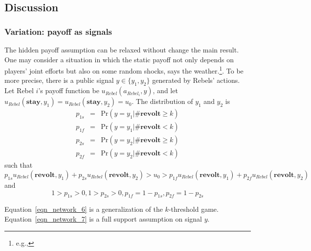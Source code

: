 \documentclass[12pt,letter]{article}
\theoremstyle{definition}
\theoremstyle{remark}
\theoremstyle{claim}
\begin{document}
\subsection{Discussion}
\label{sec:varies}


\subsubsection{Variation: payoff as signals}
The hidden payoff assumption can be relaxed without change the main result. One may consider a situation in which the static payoff not only depends on players' joint efforts but also on some  random shocks, says the weather.\footnote{e.g.,\citep{SHADMEHR2011}}. To be more precise, there is a public signal $y\in \{y_1,y_2\}$ generated by Rebels' actions. Let Rebel $i$'s payoff function be $u_{Rebel}(a_{Rebel_i},y)$, and let $u_{Rebel}(\textbf{stay},y_1)=u_{Rebel}(\textbf{stay},y_2)=u_0$. The distribution of $y_1$ and $y_2$ is 
\begin{eqnarray*}
p_{1s} &=& \mathrm {Pr}(y=y_1|\#\textbf{revolt}\geq k) \\
p_{1f} &=& \mathrm {Pr}(y=y_1|\#\textbf{revolt}< k) \\
p_{2s} &=& \mathrm {Pr}(y=y_2|\#\textbf{revolt}\geq k) \\
p_{2f} &=& \mathrm {Pr}(y=y_2|\#\textbf{revolt}< k) 
\end{eqnarray*}
such that
\begin{equation}
p_{1s}u_{Rebel}(\textbf{revolt}, y_1)+p_{2s}u_{Rebel}(\textbf{revolt}, y_2)>u_0>p_{1f}u_{Rebel}(\textbf{revolt}, y_1)+p_{2f}u_{Rebel}(\textbf{revolt}, y_2) \label{eqn_network_6}
\end{equation}
and
\begin{equation}
1>p_{1s}>0,1>p_{2s}>0,p_{1f}=1-p_{1s},p_{2f}=1-p_{2s} \label{eqn_network_7}
\end{equation}

Equation~\ref{eqn_network_6} is a generalization of the $k$-threshold game. Equation~\ref{eqn_network_7} is a full support assumption on signal $y$. 
\end{document}
